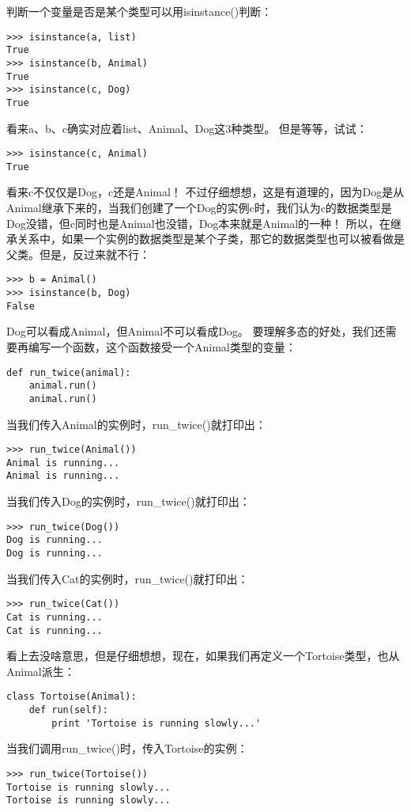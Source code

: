 \documentclass[twoside,11pt]{book}
\begin{document}
判断一个变量是否是某个类型可以用isinstance()判断：
\begin{lstlisting}
>>> isinstance(a, list)
True
>>> isinstance(b, Animal)
True
>>> isinstance(c, Dog)
True
\end{lstlisting}

看来a、b、c确实对应着list、Animal、Dog这3种类型。
但是等等，试试：
\begin{lstlisting}
>>> isinstance(c, Animal)
True
\end{lstlisting}

看来c不仅仅是Dog，c还是Animal！
不过仔细想想，这是有道理的，因为Dog是从Animal继承下来的，当我们创建了一个Dog的实例c时，我们认为c的数据类型是Dog没错，但c同时也是Animal也没错，Dog本来就是Animal的一种！
所以，在继承关系中，如果一个实例的数据类型是某个子类，那它的数据类型也可以被看做是父类。但是，反过来就不行：
\begin{lstlisting}
>>> b = Animal()
>>> isinstance(b, Dog)
False
\end{lstlisting}

Dog可以看成Animal，但Animal不可以看成Dog。
要理解多态的好处，我们还需要再编写一个函数，这个函数接受一个Animal类型的变量：
\begin{lstlisting}
def run_twice(animal):
    animal.run()
    animal.run()
\end{lstlisting}

当我们传入Animal的实例时，run\_twice()就打印出：
\begin{lstlisting}
>>> run_twice(Animal())
Animal is running...
Animal is running...
\end{lstlisting}

当我们传入Dog的实例时，run\_twice()就打印出：
\begin{lstlisting}
>>> run_twice(Dog())
Dog is running...
Dog is running...
\end{lstlisting}

当我们传入Cat的实例时，run\_twice()就打印出：
\begin{lstlisting}
>>> run_twice(Cat())
Cat is running...
Cat is running...
\end{lstlisting}

看上去没啥意思，但是仔细想想，现在，如果我们再定义一个Tortoise类型，也从Animal派生：
\begin{lstlisting}
class Tortoise(Animal):
    def run(self):
        print 'Tortoise is running slowly...'
\end{lstlisting}

当我们调用run\_twice()时，传入Tortoise的实例：
\begin{lstlisting}
>>> run_twice(Tortoise())
Tortoise is running slowly...
Tortoise is running slowly...
\end{lstlisting}
\end{document}
